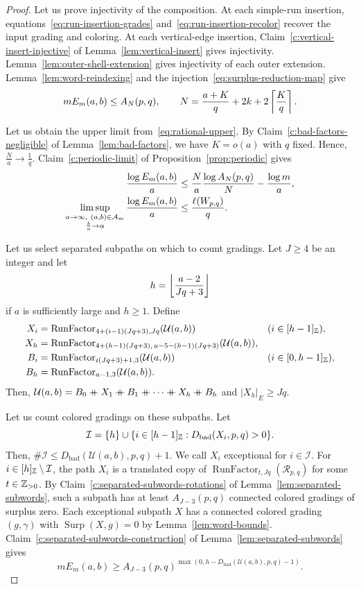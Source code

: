 \begin{proof}
Let us prove injectivity of the composition.
At each simple-run insertion, equations~\eqref{eq:run-insertion-grades} and~\eqref{eq:run-insertion-recolor} recover the input grading and coloring.
At each vertical-edge insertion, Claim~\ref{c:vertical-insert-injective} of Lemma~\ref{lem:vertical-insert} gives injectivity.
Lemma~\ref{lem:outer-shell-extension} gives injectivity of each outer extension.
Lemma~\ref{lem:word-reindexing} and the injection~\eqref{eq:surplus-reduction-map} give
\begin{equation}\label{eq:rational-upper}
 mE_m(a,b)\le A_N(p,q),\qquad
 N=\frac{a+K}q+2k+2\left\lceil\frac{K}{q}\right\rceil.
\end{equation}

Let us obtain the upper limit from~\eqref{eq:rational-upper}.
By Claim~\ref{c:bad-factors-negligible} of Lemma~\ref{lem:bad-factors}, we have $K=o(a)$ with $q$ fixed. Hence, $\frac{N}{a}\to\frac1q$. Claim~\ref{c:periodic-limit} of Proposition~\ref{prop:periodic} gives
\[
 \begin{aligned}
 \frac{\log E_m(a,b)}a&\le\frac{N}{a}\frac{\log A_N(p,q)}{N}-\frac{\log m}{a},\\
 \limsup_{\substack{a\to\infty,\ (a,b)\in\mathcal A_m\\\frac{b}{a}\to\alpha}}
 \frac{\log E_m(a,b)}a&\le\frac{\ell(W_{p,q})}q.
 \end{aligned}
\]

Let us select separated subpaths on which to count gradings.
Let $J\ge4$ be an integer and let
\[
 h=\left\lfloor\frac{a-2}{Jq+3}\right\rfloor
\]
if $a$ is sufficiently large and $h\ge1$. Define
\[
\begin{aligned}
 X_i&=\operatorname{RunFactor}_{4+(i-1)(Jq+3),Jq}(\mathcal U(a,b))
       &&(i\in[h-1]_{\mathbb Z}),\\
 X_h&=\operatorname{RunFactor}_{4+(h-1)(Jq+3),\,a-5-(h-1)(Jq+3)}(\mathcal U(a,b)),\\
 B_i&=\operatorname{RunFactor}_{i(Jq+3)+1,3}(\mathcal U(a,b))
       &&(i\in[0,h-1]_{\mathbb Z}),\\
 B_h&=\operatorname{RunFactor}_{a-1,3}(\mathcal U(a,b)).
\end{aligned}
\]
Then, $\mathcal U(a,b)=B_0\ccn X_1\ccn B_1\ccn \cdots\ccn X_h\ccn B_h$ and $|X_h|_E\ge Jq$.

Let us count colored gradings on these subpaths.
Let
\[
 \mathcal I=\{h\}\cup\{i\in[h-1]_{\mathbb Z}:D_{\mathrm{bad}}(X_i,p,q)>0\}.
\]
Then, $\#\mathcal I\le D_{\mathrm{bad}}(\mathcal U(a,b),p,q)+1$.
We call $X_i$ exceptional for $i\in\mathcal I$.
For $i\in[h]_{\mathbb Z}\setminus\mathcal I$, the path $X_i$ is a translated copy of $\operatorname{RunFactor}_{t,Jq}(\mathcal R_{p,q})$ for some $t\in\mathbb Z_{>0}$. By Claim~\ref{c:separated-subwords-rotations} of Lemma~\ref{lem:separated-subwords}, such a subpath has at least $A_{J-3}(p,q)$ connected colored gradings of surplus zero.
Each exceptional subpath $X$ has a connected colored grading $(g,\gamma)$ with
$\operatorname{Surp}(X,g)=0$ by Lemma~\ref{lem:word-bounds}.
Claim~\ref{c:separated-subwords-construction} of Lemma~\ref{lem:separated-subwords} gives
\[
 mE_m(a,b)\ge A_{J-3}(p,q)^{\max(0,h-D_{\mathrm{bad}}(\mathcal U(a,b),p,q)-1)}.
\]


\end{proof}
